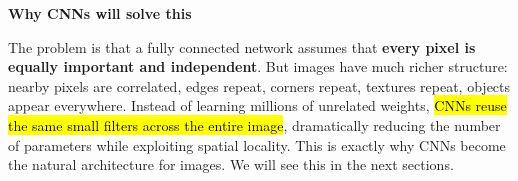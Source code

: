 \highspace
\begin{flushleft}
    \textcolor{Green3}{ \textbf{Why CNNs will solve this}}
\end{flushleft}
The problem is that a fully connected network assumes that \textbf{every pixel is equally important and independent}. But images have much richer structure: nearby pixels are correlated, edges repeat, corners repeat, textures repeat, objects appear everywhere. Instead of learning millions of unrelated weights, \hl{CNNs reuse the same small filters across the entire image}, dramatically reducing the number of parameters while exploiting spatial locality. This is exactly why CNNs become the natural architecture for images. We will see this in the next sections.
